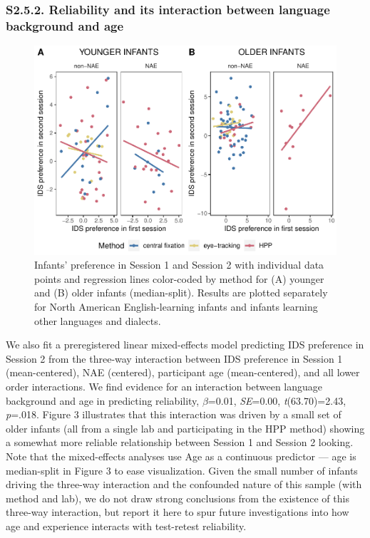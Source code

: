\documentclass[
  english,
  man, donotrepeattitle,floatsintext]{apa6}
\begin{document}
\hypertarget{s2.5.2.-reliability-and-its-interaction-between-language-background-and-age}{%
\subsubsection{S2.5.2. Reliability and its interaction between language background and age}\label{s2.5.2.-reliability-and-its-interaction-between-language-background-and-age}}

\begin{figure}
\centering
\includegraphics{MB1T_supplement_files/figure-latex/unnamed-chunk-17-1.pdf}
\caption{\label{fig:unnamed-chunk-17}Infants' preference in Session 1 and Session 2 with individual data points and regression lines color-coded by method for (A) younger and (B) older infants (median-split). Results are plotted separately for North American English-learning infants and infants learning other languages and dialects.}
\end{figure}

We also fit a preregistered linear mixed-effects model predicting IDS preference in Session 2 from the three-way interaction between IDS preference in Session 1 (mean-centered), NAE (centered), participant age (mean-centered), and all lower order interactions.
We find evidence for an interaction between language background and age in predicting reliability, \(\beta\)=0.01, \emph{SE}=0.00, \emph{t}(63.70)=2.43, \emph{p}=.018.
Figure 3 illustrates that this interaction was driven by a small set of older infants (all from a single lab and participating in the HPP method) showing a somewhat more reliable relationship between Session 1 and Session 2 looking.
Note that the mixed-effects analyses use Age as a continuous predictor --- age is median-split in Figure 3 to ease visualization.
Given the small number of infants driving the three-way interaction and the confounded nature of this sample (with method and lab), we do not draw strong conclusions from the existence of this three-way interaction, but report it here to spur future investigations into how age and experience interacts with test-retest reliability.
\end{document}
